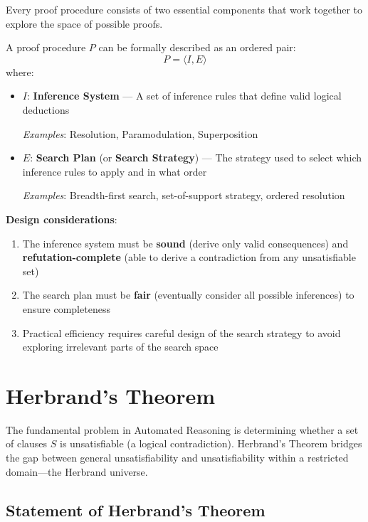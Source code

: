 \documentclass[11pt,a4paper]{article}
\theoremstyle{definition}
\theoremstyle{plain}
\theoremstyle{remark}
\begin{document}
Every proof procedure consists of two essential components that work together to explore the space of possible proofs.

\begin{tcolorbox}[colback=blue!5!white,colframe=blue!75!black,title=\textbf{Components of a Proof Procedure}]
A proof procedure $P$ can be formally described as an ordered pair:
\[ P = \langle I, E \rangle \]
where:
\begin{itemize}
    \item $I$: \textbf{Inference System} --- A set of inference rules that define valid logical deductions

    \textit{Examples}: Resolution, Paramodulation, Superposition

    \item $E$: \textbf{Search Plan} (or \textbf{Search Strategy}) --- The strategy used to select which inference rules to apply and in what order

    \textit{Examples}: Breadth-first search, set-of-support strategy, ordered resolution
\end{itemize}
\end{tcolorbox}

\textbf{Design considerations}:
\begin{enumerate}
    \item The inference system must be \textbf{sound} (derive only valid consequences) and \textbf{refutation-complete} (able to derive a contradiction from any unsatisfiable set)
    \item The search plan must be \textbf{fair} (eventually consider all possible inferences) to ensure completeness
    \item Practical efficiency requires careful design of the search strategy to avoid exploring irrelevant parts of the search space
\end{enumerate}



\section{Herbrand's Theorem}

The fundamental problem in Automated Reasoning is determining whether a set of clauses $S$ is unsatisfiable (a logical contradiction). Herbrand's Theorem bridges the gap between general unsatisfiability and unsatisfiability within a restricted domain---the Herbrand universe.

\subsection{Statement of Herbrand's Theorem}
\end{document}
